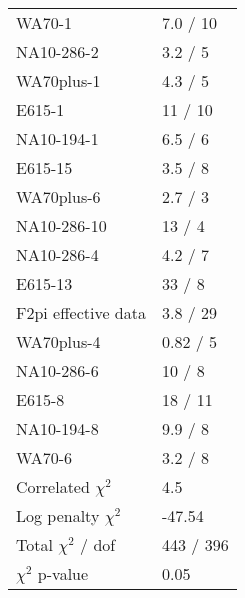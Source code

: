 \documentclass[14pt]{report}
\begin{document}
\begin{table}
\begin{center}
{\begin{tabular}{lp{2.57cm}}
  WA70-1 & 7.0 / 10  \\ 
  NA10-286-2 & 3.2 / 5  \\ 
  WA70plus-1 & 4.3 / 5  \\ 
  E615-1 & 11 / 10  \\ 
  NA10-194-1 & 6.5 / 6  \\ 
  E615-15 & 3.5 / 8  \\ 
  WA70plus-6 & 2.7 / 3  \\ 
  NA10-286-10 & 13 / 4  \\ 
  NA10-286-4 & 4.2 / 7  \\ 
  E615-13 & 33 / 8  \\ 
  F2pi effective data & 3.8 / 29  \\ 
  WA70plus-4 & 0.82 / 5  \\ 
  NA10-286-6 & 10 / 8  \\ 
  E615-8 & 18 / 11  \\ 
  NA10-194-8 & 9.9 / 8  \\ 
  WA70-6 & 3.2 / 8  \\ 
  Correlated $\chi^2$  & 4.5  \\ 
  Log penalty $\chi^2$  & -47.54  \\ 
  \rowcolor{white}
      \midrule
  Total $\chi^2$ / dof  & 443 / 396  \\ 
  \rowcolor{white}
      \midrule
  $\chi^2$ p-value  & 0.05   \\ 
      \bottomrule
    \end{tabular}
  }
  \end{center}
\end{table}
\end{document}
